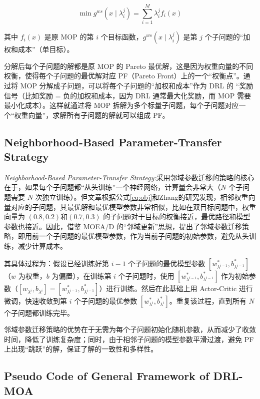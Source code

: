 \documentclass[fontset=none]{ctexart}
\begin{document}
\begin{equation}
    \min g^{ws}(x\mid \lambda^j_i) = \sum_{i=1}^{M} \lambda^j_i f_i(x)\label{eq:obj}
\end{equation}

其中 $f_i(x)$ 是原 MOP 的第 $i$ 个目标函数，$g^{ws}(x\mid \lambda^j_i)$ 是第 $j$ 个子问题的“加权和成本”（单目标）。 

分解后每个子问题的解都是原 MOP 的 Pareto 最优解，这是因为权重向量的不同权衡，使得每个子问题的最优解对应 PF（Pareto Front）上的一个“权衡点”。通过将 MOP 分解成子问题，可以将每个子问题的“加权和成本”作为 DRL 的 “奖励信号（比如奖励 = 负的加权和成本，因为 DRL 通常最大化奖励，而 MOP 需要最小化成本）。这样就通过将 MOP 拆解为多个标量子问题，每个子问题对应一个“权重向量”，求解所有子问题的解就可以组成 PF。

\subsection{Neighborhood-Based Parameter-Transfer Strategy}

\textit{Neighborhood-Based Parameter-Transfer Strategy:}采用邻域参数迁移的策略的核心在于，如果每个子问题都“从头训练”一个神经网络，计算量会非常大（$N$ 个子问题需要 $N$ 次独立训练）。但文章根据公式\cref{eq:obj}和Zhang的研究\cite{zhangMOEAMultiobjectiveEvolutionary2007}发现，相邻权重向量对应的子问题，其最优解和最优模型参数非常相似，比如在双目标问题中，权重向量为 $(0.8,0.2)$和$(0.7,0.3)$ 的子问题对于目标的权衡接近，最优路径和模型参数也接近。因此，借鉴 MOEA/D 的“邻域更新”思想\cite{zhangMOEAMultiobjectiveEvolutionary2007}，提出了邻域参数迁移策略，即用前一个子问题的最优模型参数，作为当前子问题的初始参数，避免从头训练，减少计算成本。

其具体过程为：假设已经训练好第 $i - 1$ 个子问题的最优模型参数 $[w_{\lambda^{i-1}}^*, b_{\lambda^{i-1}}^*]$（$w$ 为权重，$b$ 为偏置），在训练第 $i$ 个子问题时，使用 $[w_{\lambda^{i-1}}^*, b_{\lambda^{i-1}}^*]$ 作为初始参数（$[w_{\lambda^i}, b_{\lambda^i}] = [w_{\lambda^{i-1}}^*, b_{\lambda^{i-1}}^*]$）进行训练。然后在此基础上用 Actor-Critic 进行微调，快速收敛到第 $i$ 个子问题的最优参数 $[w_{\lambda^i}^*, b_{\lambda^i}^*]$。重复该过程，直到所有 $N$ 个子问题都训练完毕。

邻域参数迁移策略的优势在于无需为每个子问题初始化随机参数，从而减少了收敛时间，降低了训练复杂度；同时，由于相邻子问题的模型参数平滑过渡，避免 PF 上出现“跳跃”的解，保证了解的一致性和多样性。

\subsection{Pseudo Code of General Framework of DRL-MOA}
\end{document}
